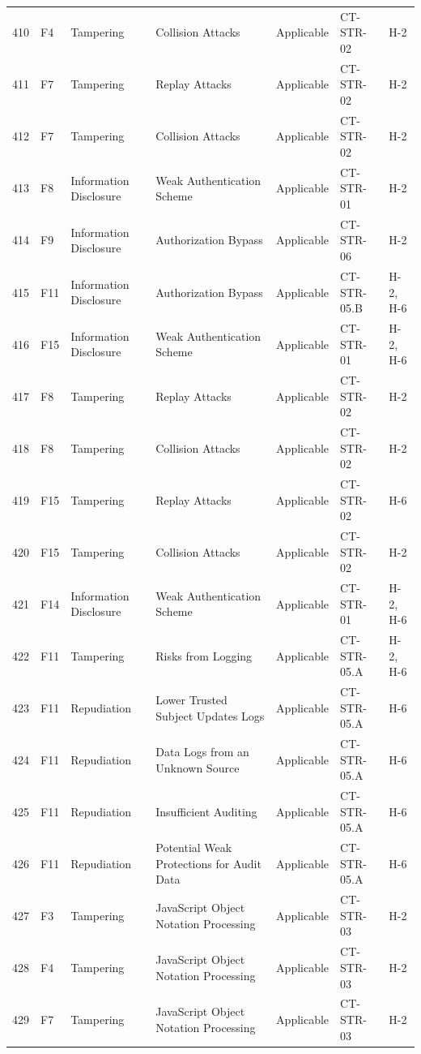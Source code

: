 \begin{footnotesize}
\begin{longtable}{l l p{} p{} p{} l p{}}
        410 & F4 & Tampering & Collision Attacks & Applicable & CT-STR-02 & H-2 \\
        411 & F7 & Tampering & Replay Attacks & Applicable & CT-STR-02 & H-2 \\
        412 & F7 & Tampering & Collision Attacks & Applicable & CT-STR-02 & H-2 \\
        413 & F8 & Information Disclosure & Weak Authentication Scheme & Applicable & CT-STR-01 & H-2 \\
        414 & F9 & Information Disclosure & Authorization Bypass & Applicable & CT-STR-06 & H-2 \\
        415 & F11 & Information Disclosure & Authorization Bypass & Applicable & CT-STR-05.B & H-2, H-6 \\
        416 & F15 & Information Disclosure & Weak Authentication Scheme & Applicable & CT-STR-01 & H-2, H-6 \\
        417 & F8 & Tampering & Replay Attacks & Applicable & CT-STR-02 & H-2 \\
        418 & F8 & Tampering & Collision Attacks & Applicable & CT-STR-02 & H-2 \\
        419 & F15 & Tampering & Replay Attacks & Applicable & CT-STR-02 & H-6 \\
        420 & F15 & Tampering & Collision Attacks & Applicable & CT-STR-02 & H-2 \\
        421 & F14 & Information Disclosure & Weak Authentication Scheme & Applicable & CT-STR-01 & H-2, H-6 \\
        422 & F11 & Tampering & Risks from Logging & Applicable & CT-STR-05.A & H-2, H-6 \\
        423 & F11 & Repudiation & Lower Trusted Subject Updates Logs & Applicable & CT-STR-05.A & H-6 \\
        424 & F11 & Repudiation & Data Logs from an Unknown Source & Applicable & CT-STR-05.A & H-6 \\
        425 & F11 & Repudiation & Insufficient Auditing & Applicable & CT-STR-05.A & H-6 \\
        426 & F11 & Repudiation & Potential Weak Protections for Audit Data & Applicable & CT-STR-05.A & H-6 \\
        427 & F3 & Tampering & JavaScript Object Notation Processing & Applicable & CT-STR-03 & H-2 \\
        428 & F4 & Tampering & JavaScript Object Notation Processing & Applicable & CT-STR-03 & H-2 \\
        429 & F7 & Tampering & JavaScript Object Notation Processing & Applicable & CT-STR-03 & H-2 \\

\end{longtable}
\end{footnotesize}

